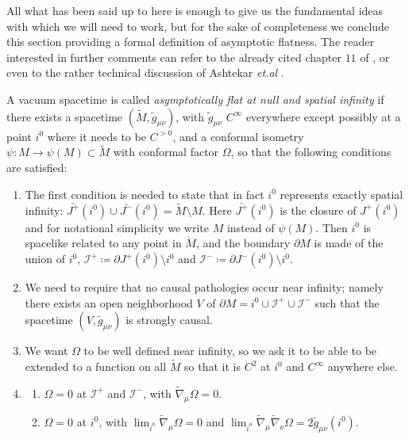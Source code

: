 All what has been said up to here is enough to give us the fundamental ideas with which we will need to work, but for the sake of completeness we conclude this section providing a formal definition of asymptotic flatness. The reader interested in further comments can refer to the already cited chapter \(11\) of \cite{wald2010general}, or even to the rather technical discussion of Ashtekar \emph{et.al} \cite{ashtekar1978unified}.
\begin{definition}
	A vacuum spacetime is called \emph{asymptotically flat at null and spatial infinity} if there exists a spacetime \((\tilde{M}, \tilde{g}_{\mu\nu})\), with \(\tilde{g}_{\mu\nu}\) \(C^{\infty}\) everywhere except possibly at a point \(i^0\) where it needs to be \(C^{>0}\), and a conformal isometry \(\psi: M \rightarrow \psi(M)\subset \tilde{M}\) with conformal factor \(\Omega\), so that the following conditions are satisfied:
	\begin{enumerate}[label=(\arabic*)]
		\item The first condition is needed to state that in fact \(i^0\) represents exactly spatial infinity: \(\bar{J^+}(i^0) \cup \bar{J^-}(i^0) = \tilde{M} \setminus M\). Here \(\bar{J^+}(i^0)\) is the closure of \(J^+(i^0)\) and for notational simplicity we write \(M\) instead of \(\psi(M)\). Then \(i^0\) is spacelike related to any point in \(\dot{M}\), and the boundary \(\partial M\) is made of the union  of \(i^0\), \(\mathscr{I}^+ \coloneqq \partial J^+(i^0) \setminus i^0\) and \(\mathscr{I}^- \coloneqq \partial J^-(i^0) \setminus i^0\).
		\item We need to require that no causal pathologies occur near infinity; namely there exists an open neighborhood \(V\) of \(\partial M = i^0 \cup \mathscr{I}^+ \cup \mathscr{I}^-\) such that the spacetime \((V, \tilde{g}_{\mu\nu})\) is strongly causal.
		\item We want \(\Omega\) to be well defined near infinity, so we ask it to be able to be extended to a function on all \(\tilde{M}\) so that it is \(C^2\) at \(i^0\) and \(C^{\infty}\) anywhere else.
		\item \begin{enumerate}
			\item \(\Omega = 0\) at \(\mathscr{I}^+\) and \(\mathscr{I}^-\), with \(\tilde{\nabla}_{\mu} \Omega = 0\).
			\item \(\Omega = 0\) at \(i^0\), with \(\lim_{i^0} \tilde{\nabla}_{\mu} \Omega = 0\) and \(\lim_{i^0} \tilde{\nabla}_{\mu} \tilde{\nabla}_{\nu}\Omega = 2\tilde{g}_{\mu\nu}(i^0)\).

\end{enumerate}
\end{enumerate}
\end{definition}
